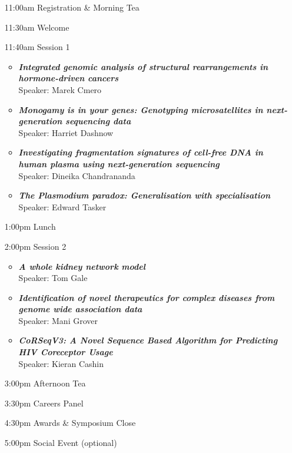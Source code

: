 \documentclass[10pt,]{article}
\begin{document}
\begin{minipage}[c]{0.8\linewidth}
    \begin{itemize}
        \item[11:00am] Registration \& Morning Tea
        \item[11:30am] Welcome
        \item[11:40am] Session 1
            \begin{itemize}
                \item \emph{\bfseries Integrated genomic analysis of structural rearrangements in hormone-driven cancers}\\Speaker: Marek Cmero
                \item \emph{\bfseries Monogamy is in your genes: Genotyping microsatellites in next-generation sequencing data}\\Speaker: Harriet Dashnow
                \item \emph{\bfseries Investigating fragmentation signatures of cell-free DNA in human plasma using next-generation sequencing}\\Speaker: Dineika Chandrananda
                \item \emph{\bfseries The Plasmodium paradox: Generalisation with specialisation}\\Speaker: Edward Tasker
            \end{itemize}
        \item[1:00pm] Lunch
        \item[2:00pm] Session 2
            \begin{itemize}
                \item \emph{\bfseries A whole kidney network model}\\Speaker: Tom Gale
                \item \emph{\bfseries Identification of novel therapeutics for complex diseases from genome wide association data}\\Speaker: Mani Grover
                \item \emph{\bfseries CoRSeqV3: A Novel Sequence Based Algorithm for Predicting HIV Coreceptor Usage}\\Speaker: Kieran Cashin
            \end{itemize}
        \item[3:00pm] Afternoon Tea
        \item[3:30pm] Careers Panel
        \item[4:30pm] Awards \& Symposium Close
        \item[5:00pm] Social Event (optional)
    \end{itemize}
\end{minipage}
\end{document}
